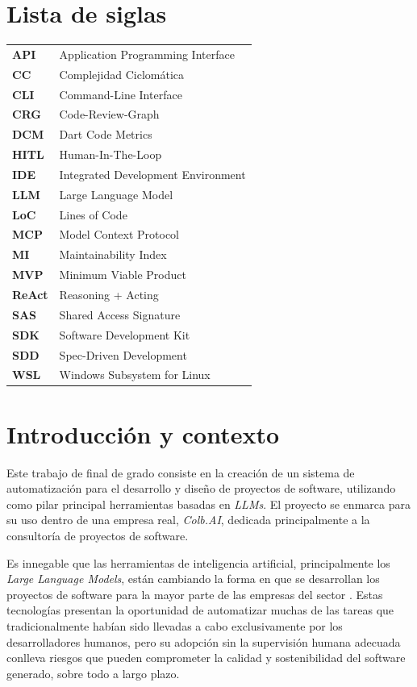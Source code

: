 \documentclass[11pt, letterpaper]{article}
\begin{document}
\section*{Lista de siglas}
\begin{tabular}{@{}lp{}}
\textbf{API}    & Application Programming Interface \\
\textbf{CC}     & Complejidad Ciclomática \\
\textbf{CLI}    & Command-Line Interface \\
\textbf{CRG}    & Code-Review-Graph \\
\textbf{DCM}    & Dart Code Metrics \\
\textbf{HITL}   & Human-In-The-Loop \\
\textbf{IDE}    & Integrated Development Environment \\
\textbf{LLM}    & Large Language Model \\
\textbf{LoC}    & Lines of Code \\
\textbf{MCP}    & Model Context Protocol \\
\textbf{MI}     & Maintainability Index \\
\textbf{MVP}    & Minimum Viable Product \\
\textbf{ReAct}  & Reasoning + Acting \\
\textbf{SAS}    & Shared Access Signature \\
\textbf{SDK}    & Software Development Kit \\
\textbf{SDD}    & Spec-Driven Development \\
\textbf{WSL}    & Windows Subsystem for Linux \\
\end{tabular}

\newpage

\section{Introducción y contexto}
\label{sec:contexto}

Este trabajo de final de grado consiste en la creación de un sistema de automatización para el desarrollo y diseño de proyectos de software, utilizando como pilar principal herramientas basadas en \textit{LLMs}. El proyecto se enmarca para su uso dentro de una empresa real, \textit{Colb.AI}, dedicada principalmente a la consultoría de proyectos de software.

Es innegable que las herramientas de inteligencia artificial, principalmente los \textit{Large Language Models}, están cambiando la forma en que se desarrollan los proyectos de software para la mayor parte de las empresas del sector \cite{jetbrains_deveco_2025}. Estas tecnologías presentan la oportunidad de automatizar muchas de las tareas que tradicionalmente habían sido llevadas a cabo exclusivamente por los desarrolladores humanos, pero su adopción sin la supervisión humana adecuada conlleva riesgos que pueden comprometer la calidad y sostenibilidad del software generado, sobre todo a largo plazo.
\end{document}
